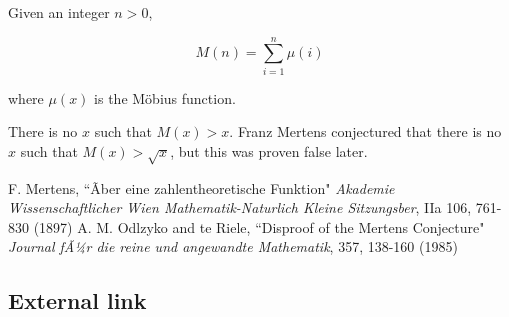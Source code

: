 \documentclass{article}
\begin{document}
Given an integer $n > 0$,

$$M(n) = \sum_{i = 1}^n \mu(i)$$

where $\mu(x)$ is the M\"obius function.

There is no $x$ such that $M(x) > x$. Franz Mertens conjectured that there is no $x$ such that $M(x) > \sqrt{x}$, but this was proven false later.

\begin{thebibliography}{6}
 F. Mertens, ``Ãber eine zahlentheoretische Funktion" {\it Akademie Wissenschaftlicher Wien Mathematik-Naturlich Kleine Sitzungsber}, IIa 106, 761-830 (1897)
 A. M. Odlzyko and te Riele, ``Disproof of the Mertens Conjecture" {\it Journal fÃ¼r die reine und angewandte Mathematik}, 357, 138-160 (1985)
\end{thebibliography}

\subsection{External link}

\end{document}
